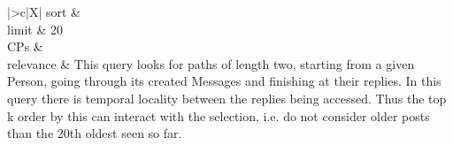 \begin{tabularx}{\queryCardWidth}{|>{\queryPropertyCell}c|X|}
%
	sort        &
        \innerCardVSpace \\ \hline
	limit & 20 \\ \hline
	CPs &
	 \\ \hline
    relevance &
        \small This query looks for paths of length two, starting from a given Person, going through its created Messages and
finishing at their replies. In this query there is temporal locality between the replies being accessed. Thus the top k
order by this can interact with the selection, i.e. do not consider older posts than the 20th oldest seen so far.
 \\ \hline%
\end{tabularx}
\queryCardVSpace